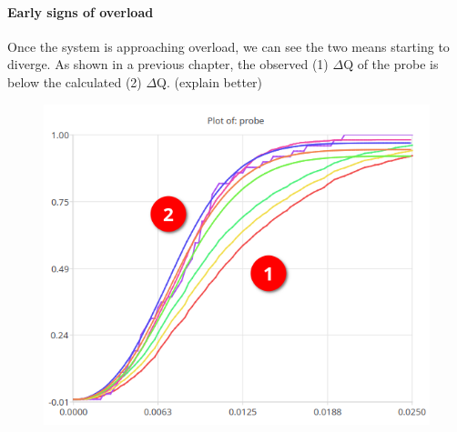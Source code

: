 \paragraph{Early signs of overload}
    
    Once the system is approaching overload, we can see the two means starting to diverge. As shown in a previous chapter, the observed (1) $\Delta$Q of the probe is below the calculated (2) $\Delta$Q. (explain better) 
    \begin{figure}[H]
        \begin{center}
            \includegraphics[scale=0.6]{img/diverging11.png}
        \end{center}
    \end{figure}
